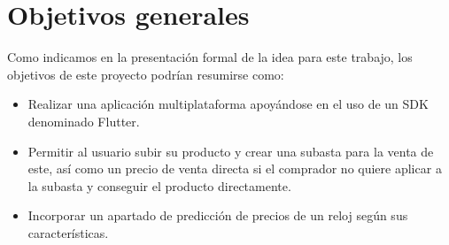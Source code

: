 
\section{Objetivos generales}

	Como indicamos en la presentación formal de la idea para este trabajo, los objetivos de este proyecto podrían resumirse como:
	
\begin{itemize}
	\item Realizar una aplicación multiplataforma apoyándose en el uso de un SDK denominado Flutter.
	\item Permitir al usuario subir su producto y crear una subasta para la venta de este, así como un precio de venta directa si el comprador no quiere aplicar a la subasta y conseguir el producto directamente.
	\item Incorporar un apartado de predicción de precios de un reloj según sus características.
\end{itemize}

